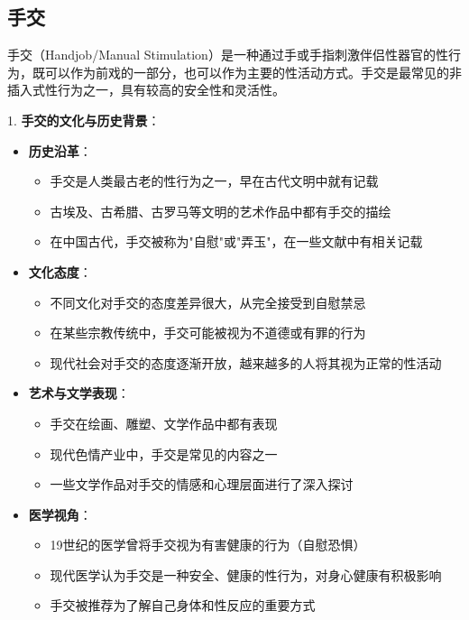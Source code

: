 \documentclass[12pt,UTF8]{ctexbook}
\begin{document}
\subsection{手交}

手交（Handjob/Manual Stimulation）是一种通过手或手指刺激伴侣性器官的性行为，既可以作为前戏的一部分，也可以作为主要的性活动方式。手交是最常见的非插入式性行为之一，具有较高的安全性和灵活性。

1. \textbf{手交的文化与历史背景}：
\begin{itemize}
	\item \textbf{历史沿革}：
	\begin{itemize}
		\item 手交是人类最古老的性行为之一，早在古代文明中就有记载
		\item 古埃及、古希腊、古罗马等文明的艺术作品中都有手交的描绘
		\item 在中国古代，手交被称为"自慰"或"弄玉"，在一些文献中有相关记载
	\end{itemize}
	\item \textbf{文化态度}：
	\begin{itemize}
		\item 不同文化对手交的态度差异很大，从完全接受到自慰禁忌
		\item 在某些宗教传统中，手交可能被视为不道德或有罪的行为
		\item 现代社会对手交的态度逐渐开放，越来越多的人将其视为正常的性活动
	\end{itemize}
	\item \textbf{艺术与文学表现}：
	\begin{itemize}
		\item 手交在绘画、雕塑、文学作品中都有表现
		\item 现代色情产业中，手交是常见的内容之一
		\item 一些文学作品对手交的情感和心理层面进行了深入探讨
	\end{itemize}
	\item \textbf{医学视角}：
	\begin{itemize}
		\item 19世纪的医学曾将手交视为有害健康的行为（自慰恐惧）
		\item 现代医学认为手交是一种安全、健康的性行为，对身心健康有积极影响
		\item 手交被推荐为了解自己身体和性反应的重要方式
	\end{itemize}
\end{itemize}
\end{document}
